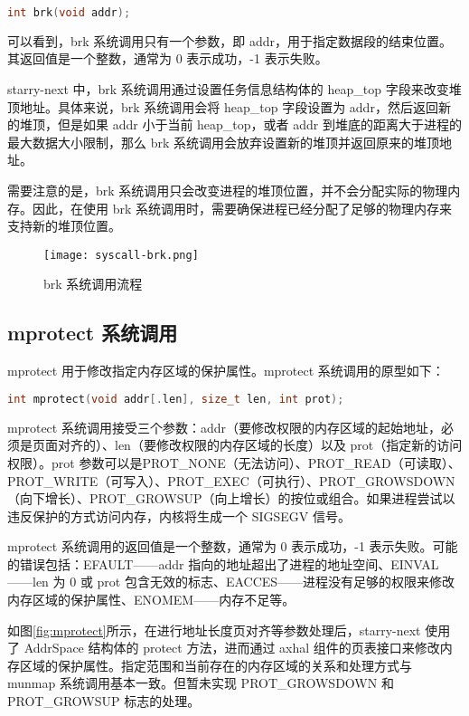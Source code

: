 \begin{lstlisting}[language=c, caption=brk]
int brk(void addr);
\end{lstlisting}


可以看到，brk 系统调用只有一个参数，即 addr，用于指定数据段的结束位置。
其返回值是一个整数，通常为 0 表示成功，-1 表示失败。

starry-next 中，brk 系统调用通过设置任务信息结构体的 heap\_top 字段来改变堆顶地址。具体来说，brk 系统调用会将 heap\_top 字段设置为 addr，然后返回新的堆顶，但是如果 addr 小于当前 heap\_top，或者 addr 到堆底的距离大于进程的最大数据大小限制，那么 brk 系统调用会放弃设置新的堆顶并返回原来的堆顶地址。

需要注意的是，brk 系统调用只会改变进程的堆顶位置，并不会分配实际的物理内存。因此，在使用 brk 系统调用时，需要确保进程已经分配了足够的物理内存来支持新的堆顶位置。

\begin{figure}[H]
    \centering
    \texttt{[image: syscall-brk.png]}
    \caption{brk 系统调用流程}
    \label{fig:brk}
\end{figure}

\subsection{mprotect 系统调用}

mprotect 用于修改指定内存区域的保护属性。mprotect 系统调用的原型如下：
\begin{lstlisting}[language=c, caption=mprotect]
int mprotect(void addr[.len], size_t len, int prot);
\end{lstlisting}

mprotect 系统调用接受三个参数：addr（要修改权限的内存区域的起始地址，必须是页面对齐的）、len（要修改权限的内存区域的长度）以及 prot（指定新的访问权限）。prot 参数可以是PROT\_NONE（无法访问）、PROT\_READ（可读取）、PROT\_WRITE（可写入）、PROT\_EXEC（可执行）、PROT\_GROWSDOWN（向下增长）、PROT\_GROWSUP（向上增长）的按位或组合。如果进程尝试以违反保护的方式访问内存，内核将生成一个 SIGSEGV 信号。

mprotect 系统调用的返回值是一个整数，通常为 0 表示成功，-1 表示失败。可能的错误包括：EFAULT——addr 指向的地址超出了进程的地址空间、EINVAL——len 为 0 或 prot 包含无效的标志、EACCES——进程没有足够的权限来修改内存区域的保护属性、ENOMEM——内存不足等。

如图\ref{fig:mprotect}所示，在进行地址长度页对齐等参数处理后，starry-next 使用了 AddrSpace 结构体的 protect 方法，进而通过 axhal 组件的页表接口来修改内存区域的保护属性。指定范围和当前存在的内存区域的关系和处理方式与 munmap 系统调用基本一致。但暂未实现 PROT\_GROWSDOWN 和 PROT\_GROWSUP 标志的处理。

